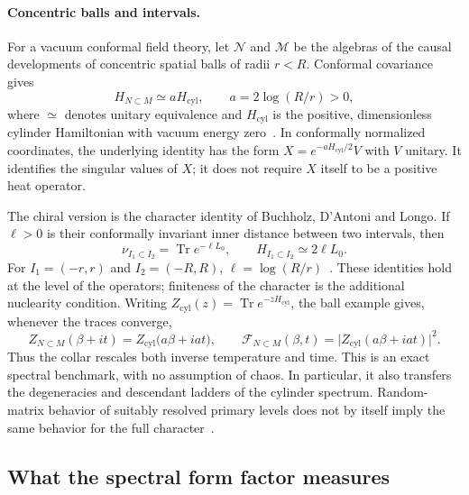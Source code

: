 \documentclass[a4paper,11pt]{article}
\theoremstyle{definition}
\begin{document}
\paragraph{Concentric balls and intervals.}
For a vacuum conformal field theory, let $\mathcal N$ and $\mathcal M$ be the algebras of the causal developments of concentric spatial balls of radii $r<R$. Conformal covariance gives
\begin{equation}
 H_{N\subset M}\simeq aH_{\mathrm{cyl}},
 \qquad a=2\log(R/r)>0,
 \label{eq:inclusion-cylinder}
\end{equation}
where $\simeq$ denotes unitary equivalence and $H_{\mathrm{cyl}}$ is the positive, dimensionless cylinder Hamiltonian with vacuum energy zero~\cite{companionQFT}. In conformally normalized coordinates, the underlying identity has the form $X=e^{-aH_{\mathrm{cyl}}/2}V$ with $V$ unitary. It identifies the singular values of $X$; it does not require $X$ itself to be a positive heat operator.

The chiral version is the character identity of Buchholz, D'Antoni and Longo. If $\ell>0$ is their conformally invariant inner distance between two intervals, then
\begin{equation}
 \nu_{I_1\subset I_2}=\operatorname{Tr}e^{-\ell L_0},
 \qquad H_{I_1\subset I_2}\simeq2\ell L_0.
 \label{eq:BDL-character}
\end{equation}
For $I_1=(-r,r)$ and $I_2=(-R,R)$, $\ell=\log(R/r)$~\cite{BDL2007}. These identities hold at the level of the operators; finiteness of the character is the additional nuclearity condition. Writing $Z_{\mathrm{cyl}}(z)=\operatorname{Tr}e^{-zH_{\mathrm{cyl}}}$, the ball example gives, whenever the traces converge,
\begin{equation}
 Z_{N\subset M}(\beta+it)=Z_{\mathrm{cyl}}\bigl(a\beta+iat\bigr),
 \qquad
 \mathcal F_{N\subset M}(\beta,t)
   =\bigl|Z_{\mathrm{cyl}}(a\beta+iat)\bigr|^2.
 \label{eq:inclusion-cylinder-SFF}
\end{equation}
Thus the collar rescales both inverse temperature and time. This is an exact spectral benchmark, with no assumption of chaos. In particular, it also transfers the degeneracies and descendant ladders of the cylinder spectrum. Random-matrix behavior of suitably resolved primary levels does not by itself imply the same behavior for the full character~\cite{HaehlMarteauReevesRozali2023}.

\subsection{What the spectral form factor measures}
\end{document}
